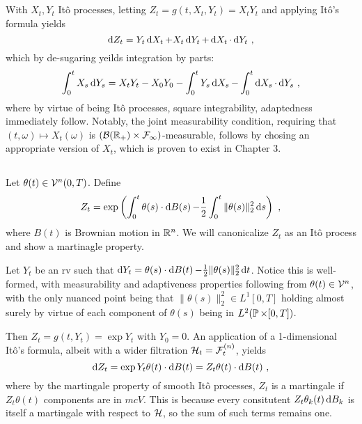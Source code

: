 \documentclass{article}
\begin{document}
\subsection{}
\label{ex:ibp}
With \(X_t,Y_t\) It\^{o} processes, letting \(Z_t=g(t, X_t, Y_t)=X_tY_t\) and applying It\^{o}'s formula yields
\[
  \d{Z_t}=Y_t\d{X_t}+X_t\d{Y_t}+\d{X_t}\cdot\d{Y_t}\,\,,
\]
which by de-sugaring yeilds integration by parts:
\[
  \int_0^tX_s\d{Y_s}=X_tY_t-X_0Y_0-\int_0^tY_s\d{X_s}-\int_0^t\d{X_s}\cdot\d{Y_s}\,\,,
\]
where by virtue of being It\^{o} processes, square integrability, adaptedness immediately follow. Notably, the joint measurability condition, requiring that \((t,\omega)\mapsto X_t(\omega)\) is \((\mcB(\R_+)\times \mcF_\infty)\)-measurable, follows by chosing an appropriate version of \(X_t\), which is proven to exist in Chapter 3.

\subsection{} %

Let \(\theta(t)\in\mcV^n(0, T)\). Define
\[
  Z_t=\exp\pa{\int_0^t\theta(s)\cdot\d{B(s)}-\frac{1}{2}\int_0^t\|\theta(s)\|_2^2\d{s}}\,\,,
\]
where \(B(t)\) is Brownian motion in \(\R^n\). We will canonicalize \(Z_t\) as an It\^{o} process and show a martinagle property.

Let \(Y_t\) be an rv such that \(\d{Y_t}=\theta(s)\cdot\d{B(t)}-\frac{1}{2}\|\theta(s)\|_2^2\d{t}\). Notice this is well-formed, with measurability and adaptiveness properties following from \(\theta(t)\in\mcV^n\), with the only nuanced point being that \(\|\theta(s)\|_2^2\in L^1[0,T]\) holding almost surely by virtue of each component of \(\theta(s)\) being in \(L^2(\P\times[0,T])\).

Then \(Z_t=g(t, Y_t)=\exp Y_t\) with \(Y_0=0\). An application of a 1-dimensional It\^{o}'s formula, albeit with a wider filtration \(\mcH_t=\mcF_t^{(n)}\), yields
\[
  \d{Z_t}=\exp Y_t \theta(t)\cdot \d{B(t)}= Z_t \theta(t)\cdot \d{B(t)}\,\,,
\]
where by the martingale property of smooth It\^{o} processes, \(Z_t\) is a martingale if \(Z_t\theta(t)\) components are in \(mcV\). This is because every consitutent \(Z_t\theta_k(t)\d{B_k}\) is itself a martingale with respect to \(\mcH\), so the sum of such terms remains one.

\subsection{} %
\end{document}
